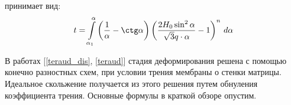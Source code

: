 принимает вид:
\begin{equation}
t=\int\limits_{\alpha_1}^{\alpha}\left(\dfrac{1}{\alpha}-\ctg \alpha\right)\left(\dfrac{2H_0\sin^2\alpha}{\sqrt 3 q \cdot \alpha}-1\right)^n \, d\alpha
\end{equation}   

В работах [\ref{teraud_dis}, \ref{teraud}] стадия деформирования решена с помощью конечно разностных схем, при условии трения 
мембраны о стенки матрицы. Идеальное скольжение получается из этого решения путем обнуления коэффициента трения.
Основные формулы в краткой обзоре опустим.
